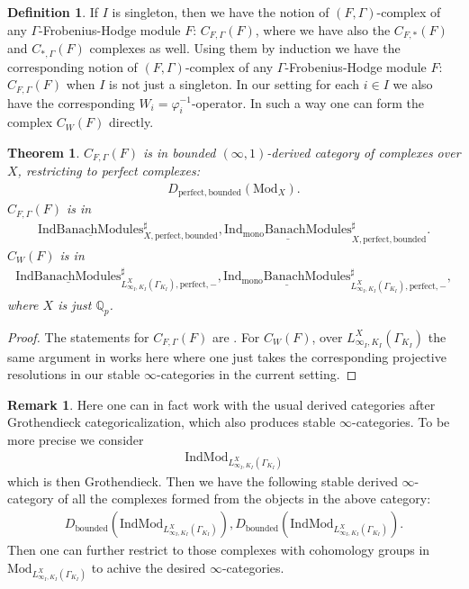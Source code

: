 \documentclass[12pt]{article}
\newtheorem{theorem}{Theorem}
\theoremstyle{definition}
\newtheorem{remark}{Remark}
\newtheorem{definition}{Definition}
\begin{document}
\begin{definition}
If $I$ is singleton, then we have the notion of $(F,\Gamma)$-complex of any $\Gamma$-Frobenius-Hodge module $F$: $C_{F,\Gamma}(F)$, where we have also the $C_{F,*}(F)$ and $C_{*,\Gamma}(F)$ complexes as well. Using them by induction we have the corresponding notion of $(F,\Gamma)$-complex of any $\Gamma$-Frobenius-Hodge module $F$: $C_{F,\Gamma}(F)$ when $I$ is not just a singleton. In our setting for each $i\in I$ we also have the corresponding $W_i=\varphi_i^{-1}$-operator. In such a way one can form the complex $C_{W}(F)$ directly.
\end{definition}


\begin{theorem}
$C_{F,\Gamma}(F)$ is in bounded $(\infty,1)$-derived category of complexes over $X$, restricting to perfect complexes:
\begin{align}
D_{\mathrm{perfect},\mathrm{bounded}}(\mathrm{Mod}_X).
\end{align}
$C_{F,\Gamma}(F)$ is in 
\begin{align}
\underline{\mathrm{IndBanachModules}}^\sharp_{X,\mathrm{perfect},\mathrm{bounded}}, \underline{\mathrm{Ind_{\mathrm{mono}}BanachModules}}^\sharp_{X, \mathrm{perfect},\mathrm{bounded}}.
\end{align} 
$C_{W}(F)$ is in 
\begin{align}
\underline{\mathrm{IndBanachModules}}^\sharp_{L^X_{\infty_I,K_I}(\Gamma_{K_I}),\mathrm{perfect},\mathrm{-}}, \underline{\mathrm{Ind_{\mathrm{mono}}BanachModules}}^\sharp_{L^X_{\infty_I,K_I}(\Gamma_{K_I}), \mathrm{perfect},\mathrm{-}},
\end{align}
where $X$ is just $\mathbb{Q}_p$.
\end{theorem}

\begin{proof}
The statements for $C_{F,\Gamma}(F)$ are \cite{T}. For $C_{W}(F)$, over $L^X_{\infty_I,K_I}(\Gamma_{K_I})$ the same argument in \cite{T} works here where one just takes the corresponding projective resolutions in our stable $\infty$-categories in the current setting.
\end{proof}



\begin{remark}
Here one can in fact work with the usual derived categories after Grothendieck categoricalization, which also produces stable $\infty$-categories. To be more precise we consider 
\begin{align}
\mathrm{Ind}\mathrm{Mod}_{L^X_{\infty_I,K_I}(\Gamma_{K_I})}
\end{align}
which is then Grothendieck. Then we have the following stable derived $\infty$-category of all the complexes formed from the objects in the above category:
\begin{align}
D_{\mathrm{bounded}}(\mathrm{Ind}\mathrm{Mod}_{L^X_{\infty_I,K_I}(\Gamma_{K_I})}), D_{\mathrm{bounded}}(\mathrm{Ind}\mathrm{Mod}_{L^X_{\infty_I,K_I}(\Gamma_{K_I})}).
\end{align}
Then one can further restrict to those complexes with cohomology groups in $\mathrm{Mod}_{L^X_{\infty_I,K_I}(\Gamma_{K_I})}$ to achive the desired $\infty$-categories.
\end{remark}
\end{document}

